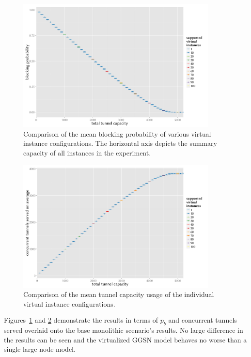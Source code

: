 \begin{figure}[htb]
	\centering
	\includegraphics[width=0.9\textwidth]{images/R-virtualized-blocking.pdf}
	\caption{Comparison of the mean blocking probability of various virtual instance configurations. The horizontal axis depicts the summary capacity of all instances in the experiment.}
\label{c4:fig:virtualized_blocking}
\end{figure}

\begin{figure}[htb]
	\centering
	\includegraphics[width=0.9\textwidth]{images/R-virtualized-tunnelusage.pdf}
	\caption{Comparison of the mean tunnel capacity usage of the individual virtual instance configurations.}
\label{c4:fig:virtualized_tunnelusage}
\end{figure}

Figures~\ref{c4:fig:virtualized_blocking} and \ref{c4:fig:virtualized_tunnelusage} demonstrate the results in terms of $p_b$ and concurrent tunnels served overlaid onto the base monolithic scenario's results. No large difference in the results can be seen and the virtualized \gls{GGSN} model behaves no worse than a single large node model.


